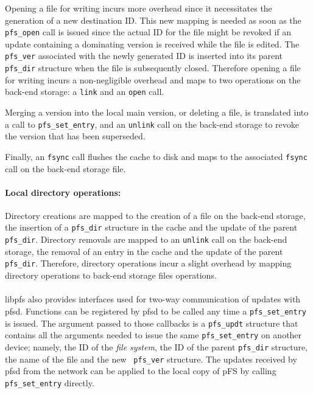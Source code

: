 Opening a file for writing incurs more overhead since it necessitates
the generation of a new destination ID. This new mapping is needed as
soon as the {\tt pfs\_open} call is issued since the actual ID for the
file might be revoked if an update containing a dominating version is
received while the file is edited. The {\tt pfs\_ver} associated with
the newly generated ID is inserted into its parent {\tt pfs\_dir}
structure when the file is subsequently closed. Therefore opening a
file for writing incurs a non-negligible overhead and maps to two
operations on the back-end storage: a {\tt link} and an {\tt open}
call.

Merging a version into the local main version, or deleting a file, is
translated into a call to {\tt pfs\_set\_entry}, and an {\tt unlink}
call on the back-end storage to revoke the version that has been
superseded.

Finally, an {\tt fsync} call flushes the cache to disk and maps to the
associated {\tt fsync} call on the back-end storage file.

\paragraph{Local directory operations:}
Directory creations are mapped to the creation of a file on the
back-end storage, the insertion of a {\tt pfs\_dir} structure in the
cache and the update of the parent {\tt pfs\_dir}. Directory removals
are mapped to an {\tt unlink} call on the back-end storage, the
removal of an entry in the cache and the update of the parent {\tt
  pfs\_dir}. Therefore, directory operations incur a slight overhead
by mapping directory operations to back-end storage files operations.

\paragraph{}
libpfs also provides interfaces used for two-way communication of
updates with pfsd. Functions can be registered by pfsd to be called
any time a {\tt pfs\_set\_entry} is issued. The argument passed to
those callbacks is a {\tt pfs\_updt} structure that contains all the
arguments needed to issue the same {\tt pfs\_set\_entry} on another
device; namely, the ID of the \emph{file system}, the ID of the parent
{\tt pfs\_dir} structure, the name of the file and the new {\tt
  pfs\_ver} structure. The updates received by pfsd from the network
can be applied to the local copy of pFS by calling {\tt
  pfs\_set\_entry} directly.

